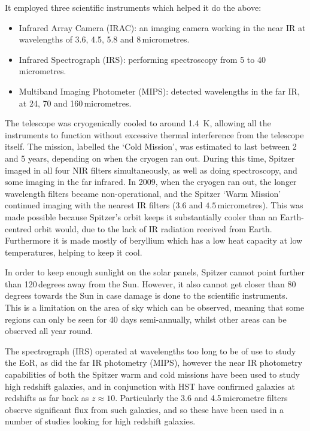 		It employed three scientific instruments which helped it do the above:
		\begin{itemize}
			\item Infrared Array Camera (IRAC): an imaging camera working in the near IR at wavelengths of 3.6, 4.5, 5.8 and 8\,micrometres.
			\item Infrared Spectrograph (IRS): performing spectroscopy from 5 to 40\,micrometres.
			\item Multiband Imaging Photometer (MIPS): detected wavelengths in the far IR, at 24, 70 and 160\,micrometres.
		\end{itemize}

		The telescope was cryogenically cooled to around \SI{1.4}{\kelvin}, allowing all the instruments to function without excessive thermal interference from the telescope itself. The mission, labelled the `Cold Mission', was estimated to last between 2 and 5 years, depending on when the cryogen ran out. During this time, Spitzer imaged in all four NIR filters simultaneously, as well as doing spectroscopy, and some imaging in the far infrared. In 2009, when the cryogen ran out, the longer wavelength filters became non-operational, and the Spitzer `Warm Mission' continued imaging with the nearest IR filters ($3.6$ and $4.5$\,micrometres). This was made possible because Spitzer's orbit keeps it substantially cooler than an Earth-centred orbit would, due to the lack of IR radiation received from Earth. Furthermore it is made mostly of beryllium which has a low heat capacity at low temperatures, helping to keep it cool.

		In order to keep enough sunlight on the solar panels, Spitzer cannot point further than 120\,degrees away from the Sun. However, it also cannot get closer than 80\,degrees towards the Sun in case damage is done to the scientific instruments. This is a limitation on the area of sky which can be observed, meaning that some regions can only be seen for 40 days semi-annually, whilst other areas can be observed all year round.

		The spectrograph (IRS) operated at wavelengths too long to be of use to study the EoR, as did the far IR photometry (MIPS), however the near IR photometry capabilities of both the Spitzer warm and cold missions have been used to study high redshift galaxies, and in conjunction with HST have confirmed galaxies at redshifts as far back as $z\approx10$. Particularly the 3.6 and 4.5\,micrometre filters observe significant flux from such galaxies, and so these have been used in a number of studies looking for high redshift galaxies.

